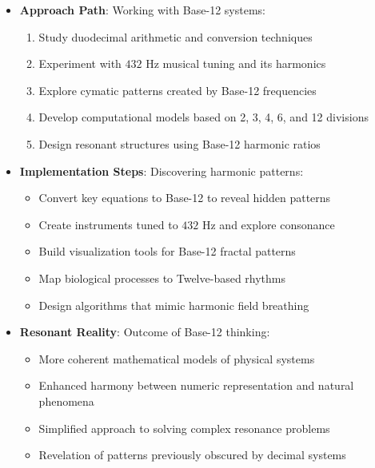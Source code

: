 \begin{itemize}
    \item \texttt{} \textbf{Approach Path}: Working with Base-12 systems:
    \begin{enumerate}
        \item Study duodecimal arithmetic and conversion techniques
        \item Experiment with \(432 \text{ Hz}\) musical tuning and its harmonics
        \item Explore cymatic patterns created by Base-12 frequencies
        \item Develop computational models based on 2, 3, 4, 6, and 12 divisions
        \item Design resonant structures using Base-12 harmonic ratios
    \end{enumerate}
    
    \item \texttt{} \textbf{Implementation Steps}: Discovering harmonic patterns:
    \begin{itemize}
        \item Convert key equations to Base-12 to reveal hidden patterns
        \item Create instruments tuned to \(432 \text{ Hz}\) and explore consonance
        \item Build visualization tools for Base-12 fractal patterns
        \item Map biological processes to Twelve-based rhythms
        \item Design algorithms that mimic harmonic field breathing
    \end{itemize}
    
    \item \texttt{} \textbf{Resonant Reality}: Outcome of Base-12 thinking:
    \begin{itemize}
        \item More coherent mathematical models of physical systems
        \item Enhanced harmony between numeric representation and natural phenomena
        \item Simplified approach to solving complex resonance problems
        \item Revelation of patterns previously obscured by decimal systems
    \end{itemize}
\end{itemize}

